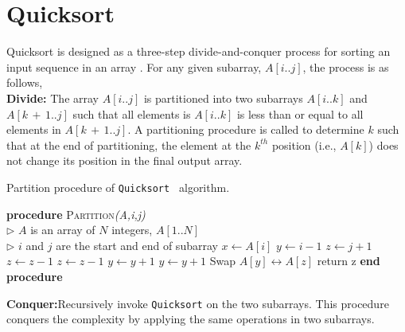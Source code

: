 \documentclass[twocolumn,a4paper]{article}
\newcommand{\tab}{\hspace{4mm} }
\begin{document}
    \vspace{-1mm}
    \section{Quicksort}
        Quicksort is designed as a three-step divide-and-conquer process for sorting an input sequence in an array \cite{clrs}.
        For any given subarray, $A[i..j]$, the process is as follows,\\[+1mm]
        \textbf{Divide:} The array $A[i..j]$ is partitioned into two subarrays $A[i..k]$ and $A[k\,+\,1..j]$ such that all elements is $A[i..k]$ is less than or equal to all elements in $A[k\,+\,1..j]$.
        A partitioning procedure is called to determine $k$ such that at the end of partitioning, the element at the $k^{th}$ position (i.e., $A[k]$) does not change its position in the final output array.

        
        \begin{algorithm}
            \caption{Partition procedure of \texttt{Quicksort } algorithm.}
            \begin{algorithmic}[1]
                \STATE \textbf{procedure} \textsc{Partition}\textit{(A,i,j)}\\
                    \(\triangleright\) $A$ is an array of $N$ integers, $A[1..N]$\\
                    \(\triangleright\) $i$ and $j$ are the start and end of subarray
                    \STATE \tab $x \gets A[i]$
                    \STATE \tab $y \gets i - 1$
                    \STATE \tab $z \gets j + 1$
                        \STATE \tab $z \gets z - 1$
                            \STATE \tab $z \gets z - 1$
                        \ENDWHILE
                        \STATE \tab $y \gets y + 1$
                            \STATE \tab $y \gets y + 1$
                        \ENDWHILE
                            \STATE \tab Swap $A[y] \leftrightarrow A[z]$
                        \ELSE
                            \STATE \tab return z
                        \ENDIF
                    \ENDWHILE
                \STATE \textbf{end procedure}
            \end{algorithmic}
        \end{algorithm}

        \noindent\textbf{Conquer:}Recursively invoke \texttt{Quicksort} on the two subarrays.
        This procedure conquers the complexity by applying the same operations in two subarrays.\\
        
\end{document}
